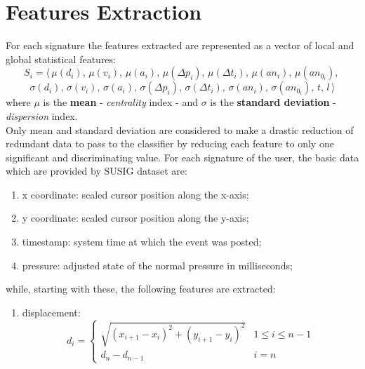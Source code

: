 \documentclass[a4paper, 10pt, conference]{IEEEconf}
\begin{document}
\section{Features Extraction}
For each signature the features extracted are represented as a vector of local and global statistical features:
  \[ S_i = \langle\,\mu(d_i),\,\mu(v_i),\,\mu(a_i),\,\mu(\Delta{p_i}),\,\mu(\Delta{t_i}),\,\mu(an_i),\,\mu(an_{0_i}),\, \] \[ \sigma(d_i),\,\sigma(v_i),\,\sigma(a_i),\,\sigma(\Delta{p_i}),\,\sigma(\Delta{t_i}),\,\sigma(an_i),\,\sigma(an_{0_i}),\,t,\,l\,\rangle \] where $\mu$ is the \textbf{mean} - \textit{centrality} index - and $\sigma$ is the \textbf{standard deviation} - \textit{dispersion} index. \\ Only mean and standard deviation are considered to make a drastic reduction of redundant data to pass to the classifier by reducing each feature to only one significant and discriminating value. For each signature of the user, the basic data which are provided by SUSIG dataset are:
	\begin{enumerate}[label=(\roman*)]
  		\item 
  			x coordinate: scaled cursor position along the x-axis;
    	\item 
    		y coordinate: scaled cursor position along the y-axis;
    	\item 
    		timestamp: system time at which the event was posted;
    	\item 
    		pressure: adjusted state of the normal pressure in milliseconds;
  	\end{enumerate}
  	while, starting with these, the following features are extracted:
  	\begin{enumerate}[label=(\roman*)]
    	\item
    		displacement:
   			\[ d_i = 
    		\left\{
    			\begin{array}{ll}
     	 		\sqrt{(x_{i+1}-x_i)^2+(y_{i+1}-y_i)^2} & 1\leq i\leq n-1 \\
     	 		d_n-d_{n-1} & i = n
   	 		\end{array}
  	 		\right.\]
	\end{enumerate}
\end{document}
